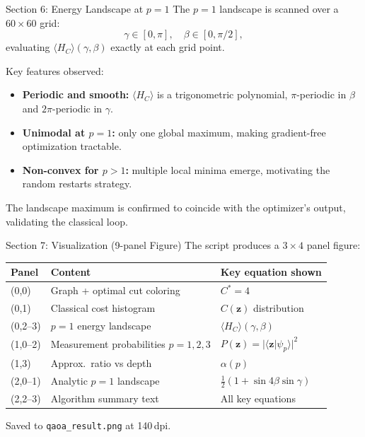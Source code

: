 \documentclass{beamer}
\begin{document}

\begin{frame}{Section 6: Energy Landscape at $p=1$}
The $p=1$ landscape is scanned over a $60\times 60$ grid:
\[
  \gamma \in [0,\pi], \quad \beta \in [0,\pi/2],
\]
evaluating $\langle H_C\rangle(\gamma,\beta)$ exactly at each grid point.

\medskip

Key features observed:
\begin{itemize}
  \item \textbf{Periodic and smooth:} $\langle H_C\rangle$ is a trigonometric
    polynomial, $\pi$-periodic in $\beta$ and $2\pi$-periodic in $\gamma$.
  \item \textbf{Unimodal at $p=1$:} only one global maximum, making
    gradient-free optimization tractable.
  \item \textbf{Non-convex for $p>1$:} multiple local minima emerge,
    motivating the random restarts strategy.
\end{itemize}

\medskip

The landscape maximum is confirmed to coincide with the optimizer's
output, validating the classical loop.
\end{frame}


\begin{frame}{Section 7: Visualization (9-panel Figure)}
The script produces a $3\times 4$ panel figure:

\medskip

\begin{center}
\small
\begin{tabular}{lll}
\hline
\textbf{Panel} & \textbf{Content} & \textbf{Key equation shown} \\
\hline
(0,0) & Graph + optimal cut coloring & $C^* = 4$ \\
(0,1) & Classical cost histogram & $C(\mathbf{z})$ distribution \\
(0,2--3) & $p=1$ energy landscape & $\langle H_C\rangle(\gamma,\beta)$ \\
(1,0--2) & Measurement probabilities $p=1,2,3$ & $P(\mathbf{z}) = |\langle\mathbf{z}|\psi_p\rangle|^2$ \\
(1,3) & Approx.\ ratio vs depth & $\alpha(p)$ \\
(2,0--1) & Analytic $p=1$ landscape & $\tfrac{1}{2}(1+\sin4\beta\sin\gamma)$ \\
(2,2--3) & Algorithm summary text & All key equations \\
\hline
\end{tabular}
\end{center}

\medskip

Saved to \texttt{qaoa\_result.png} at 140\,dpi.
\end{frame}
\end{document}
